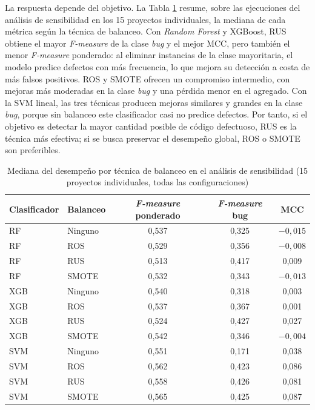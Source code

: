 La respuesta depende del objetivo. La Tabla \ref{tab:balanceo_tecnica} resume, sobre las ejecuciones del análisis de sensibilidad en los 15 proyectos individuales, la mediana de cada métrica según la técnica de balanceo. Con \textit{Random Forest} y XGBoost, RUS obtiene el mayor \textit{F-measure} de la clase \textit{bug} y el mejor MCC, pero también el menor \textit{F-measure} ponderado: al eliminar instancias de la clase mayoritaria, el modelo predice defectos con más frecuencia, lo que mejora su detección a costa de más falsos positivos. ROS y SMOTE ofrecen un compromiso intermedio, con mejoras más moderadas en la clase \textit{bug} y una pérdida menor en el agregado. Con la SVM lineal, las tres técnicas producen mejoras similares y grandes en la clase \textit{bug}, porque sin balanceo este clasificador casi no predice defectos. Por tanto, si el objetivo es detectar la mayor cantidad posible de código defectuoso, RUS es la técnica más efectiva; si se busca preservar el desempeño global, ROS o SMOTE son preferibles.

\begin{table}[H]
\centering
\caption{Mediana del desempeño por técnica de balanceo en el análisis de sensibilidad (15 proyectos individuales, todas las configuraciones)}
\label{tab:balanceo_tecnica}
\begin{tabular}{llccc}
\toprule
Clasificador & Balanceo & \textit{F-measure} ponderado & \textit{F-measure} bug & MCC \\
\midrule
RF   & Ninguno & 0,537 & 0,325 & $-0{,}015$ \\
RF   & ROS     & 0,529 & 0,356 & $-0{,}008$ \\
RF   & RUS     & 0,513 & 0,417 & 0,009 \\
RF   & SMOTE   & 0,532 & 0,343 & $-0{,}013$ \\
\midrule
XGB  & Ninguno & 0,540 & 0,318 & 0,003 \\
XGB  & ROS     & 0,537 & 0,367 & 0,001 \\
XGB  & RUS     & 0,524 & 0,427 & 0,027 \\
XGB  & SMOTE   & 0,542 & 0,346 & $-0{,}004$ \\
\midrule
SVM  & Ninguno & 0,551 & 0,171 & 0,038 \\
SVM  & ROS     & 0,562 & 0,423 & 0,086 \\
SVM  & RUS     & 0,558 & 0,426 & 0,081 \\
SVM  & SMOTE   & 0,565 & 0,425 & 0,087 \\
\bottomrule
\end{tabular}
\end{table}

